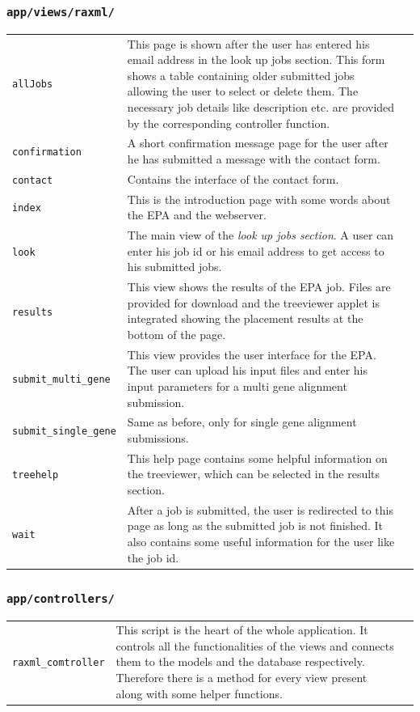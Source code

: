 \documentclass{scrartcl}
\begin{document}
				\subsubsection{\texttt{app/views/raxml/}} 
					\begin{tabular}[c]{lp{10.6cm}l}
						\texttt{allJobs}  & This page is shown after the user has entered his email address in the look up jobs section. This form shows a table containing older submitted jobs allowing the user to select or delete them. The necessary job details like description etc. are provided by the corresponding controller function. \\
						\texttt{confirmation}  & A short confirmation message page for the user after he has submitted a message with the contact form. \\
						\texttt{contact}  & Contains the interface of the contact form. \\
						\texttt{index}  & This is the introduction page with some words about the EPA and the webserver. \\
						\texttt{look}  &  The main view of the \textit{look up jobs section}. A user can enter his  job id or his email address to get access to his submitted jobs.\\
						\texttt{results}  & This view shows the results of the EPA job. Files are provided for download and the treeviewer applet is integrated showing the placement results at the bottom of the page.\\
						\texttt{submit\_multi\_gene}  &  This view provides the user interface for the EPA. The user can upload his input files and enter his input parameters for a multi gene alignment submission.\\
						\texttt{submit\_single\_gene}  & Same as before, only for single gene alignment submissions. \\
						\texttt{treehelp}  & This help page contains some helpful information on the treeviewer, which can be selected in the results section. \\
						\texttt{wait}  & After a job is submitted, the user is redirected to this page as long as the submitted job is not finished. It also contains some useful information for the user like the job id.
					\end{tabular}
				\subsubsection{\texttt{app/controllers/}}
					\begin{tabular}[c]{lp{10.9cm}l}
						\texttt{raxml\_comtroller}  & This script is the heart of the whole application. It controls all the functionalities of the views and connects them to the models and the database respectively. Therefore there is a method for every view present along with some helper functions. \\
					\end{tabular}
\end{document}
